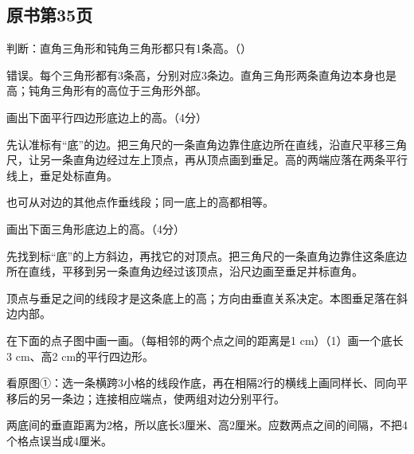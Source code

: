 

\subsection*{原书第35页}

判断：直角三角形和钝角三角形都只有1条高。（\hspace{1.8em}）\par
\begin{BookAnswer}
错误。每个三角形都有3条高，分别对应3条边。直角三角形两条直角边本身也是高；钝角三角形有的高位于三角形外部。
\end{BookAnswer}

画出下面平行四边形底边上的高。（4分）\par
{}
\begin{BookAnswer}
先认准标有“底”的边。把三角尺的一条直角边靠住底边所在直线，沿直尺平移三角尺，让另一条直角边经过左上顶点，再从顶点画到垂足。高的两端应落在两条平行线上，垂足处标直角。\par 也可从对边的其他点作垂线段；同一底上的高都相等。
\end{BookAnswer}

画出下面三角形底边上的高。（4分）\par
{}
\begin{BookAnswer}
先找到标“底”的上方斜边，再找它的对顶点。把三角尺的一条直角边靠住这条底边所在直线，平移到另一条直角边经过该顶点，沿尺边画至垂足并标直角。\par 顶点与垂足之间的线段才是这条底上的高；方向由垂直关系决定。本图垂足落在斜边内部。
\end{BookAnswer}

在下面的点子图中画一画。（每相邻的两个点之间的距离是1 cm）（1）画一个底长3 cm、高2 cm的平行四边形。\par
{}
\begin{BookAnswer}
看原图①：选一条横跨3小格的线段作底，再在相隔2行的横线上画同样长、同向平移后的另一条边；连接相应端点，使两组对边分别平行。\par 两底间的垂直距离为2格，所以底长3厘米、高2厘米。应数两点之间的间隔，不把4个格点误当成4厘米。
\end{BookAnswer}

